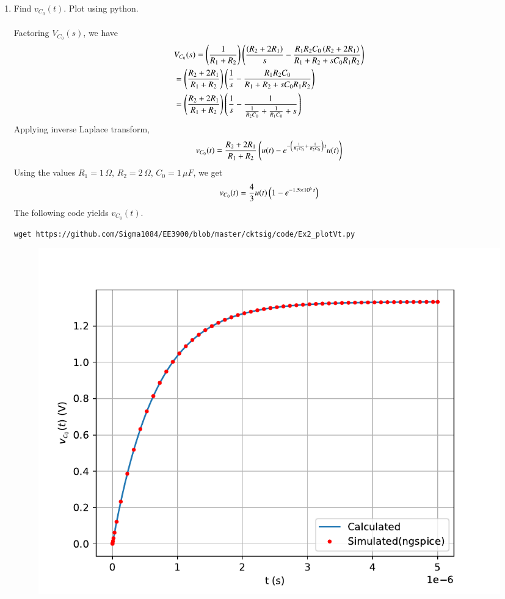 \documentclass[journal,12pt,twocolumn]{IEEEtran}
\renewcommand\thesection{\arabic{section}}
\begin{document}
\begin{enumerate}[label=\arabic*.,ref=\thesection.\theenumi]
\item Find $v_{C_0}(t)$.  Plot using python.\\
	\solution\\
	Factoring $V_{C_0}(s)$, we have 
	\begin{align*}
		&V_{C_0}(s) = \left( \frac{1}{R_1+R_2} \right) \left( \frac{\left(R_2 + 2R_1\right)}{s} - \frac{R_1 R_2 C_0 \left(R_2 + 2R_1\right)}{R_1 + R_2 + sC_0 R_1 R_2} \right) \\
		&= \left(\frac{R_2 + 2R_1}{R_1 + R_2}\right) \left(\frac{1}{s} - \frac{R_1 R_2 C_0}{R_1 + R_2 + sC_0 R_1 R_2}\right) \\
		&= \left(\frac{R_2 + 2R_1}{R_1 + R_2}\right) \left(\frac{1}{s} - \frac{1}{\frac{1}{R_2 C_0} + \frac{1}{R_1 C_0} + s}\right) 
	\end{align*}
	Applying inverse Laplace transform,
	\begin{align}
		v_{C_0}(t) = \frac{R_2 + 2R_1}{R_1 + R_2} \left(u(t) - e^{-\left(\frac{1}{R_1 C_0} + \frac{1}{R_2 C_0}\right) \, t} u(t)\right)
		\label{eq:vC0}
	\end{align}
	Using the values $R_1 = 1 \, \Omega$, $R_2 = 2 \, \Omega$, $C_0 = 1 \, \mu F$, we get
	\begin{align*}
		v_{C_0}(t) = \frac{4}{3} u(t) \left(1 - e^{-1.5 \times 10^{6} \, t}\right) 
	\end{align*}
	The following code yields $v_{C_0}(t)$.
	\begin{lstlisting}
wget https://github.com/Sigma1084/EE3900/blob/master/cktsig/code/Ex2_plotVt.py
	\end{lstlisting}
	\begin{figure}[!ht]
		\centering
		\includegraphics[width=\columnwidth]{figs/Ex2_vt.pdf}
		\caption {}
		\label{fig:vt_calc}
	\end{figure}
	\pagebreak



\end{enumerate}
\end{document}
